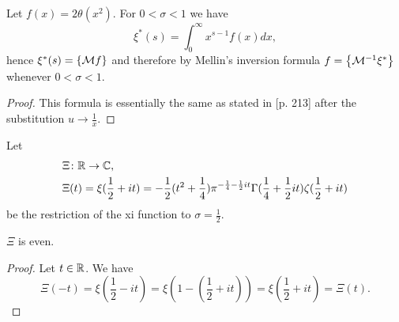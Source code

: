 \begin{lemma}\label{lem:XiMellin}
	Let $f(x) = 2 \theta(x^2)$. For $0 < \sigma < 1$ we have
\begin{equation*}
	\xi^*(s) = \int _0 ^\infty x^{s - 1} f(x) dx,
\end{equation*}
	hence $\xi^*(s) = \left\{\mathcal{M} f\right\}$ and therefore by Mellin's inversion formula $f = \left\{\mathcal{M}^{-1} \xi^*\right\}$ whenever $0 < \sigma < 1$.
\end{lemma}
\begin{proof}
	This formula is essentially the same as stated in \cite{Edwards1974} [p. 213] after the substitution $u \to \frac{1}{x}$.
\end{proof}


\begin{definition}
	Let
\begin{equation*}
\begin{aligned}
	&\Xi \colon \mathbb{R} \to \mathbb{C}, \\
	&\Xi(t) = \xi(\frac{1}{2} + it) = -\frac{1}{2}(t^2 + \frac{1}{4}) \pi ^{-\frac{1}{4} - \frac{1}{2} it} \Gamma(\frac{1}{4} + \frac{1}{2} it) \zeta(\frac{1}{2} + it)
\end{aligned}
\end{equation*}
	be the restriction of the xi function to $\sigma = \frac{1}{2}$.
\end{definition}


\begin{lemma}
	$\Xi$ is even.
\end{lemma}
\begin{proof}
	Let $t \in \mathbb{R}$. We have
\begin{equation*}
	\Xi(-t) = \xi(\frac{1}{2} - it) = \xi(1 - (\frac{1}{2} + it)) = \xi(\frac{1}{2} + it) = \Xi(t).
\end{equation*}
\end{proof}


